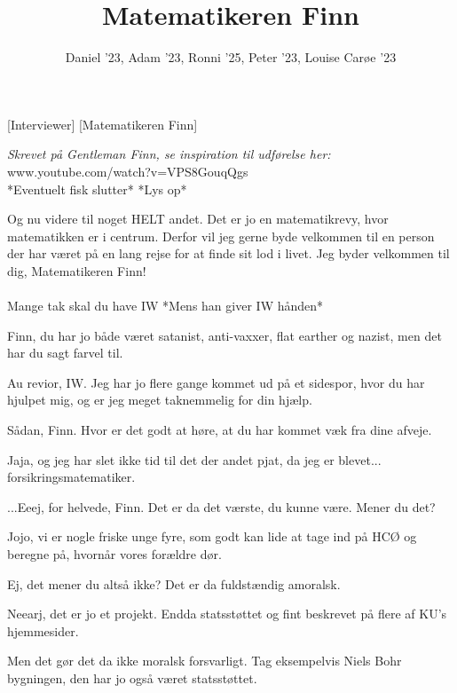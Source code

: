 \documentclass{article}
\title{Matematikeren Finn}
\author{Daniel '23, Adam '23, Ronni '25, Peter '23, Louise Carøe '23}
\begin{document}
\maketitle

\begin{roles}
[Interviewer]
[Matematikeren Finn]
\end{roles}

\begin{sketch}
\noindent\textit{Skrevet på Gentleman Finn, se inspiration til udførelse her:}\\
www.youtube.com/watch?v=VPS8GouqQgs\\

*Eventuelt fisk slutter*
*Lys op*

 Og nu videre til noget HELT andet. Det er jo en matematikrevy, hvor matematikken er i centrum. Derfor vil jeg gerne byde velkommen til en person der har været på en lang rejse for at finde sit lod i livet. Jeg byder velkommen til dig, Matematikeren Finn!\\

\\

 Mange tak skal du have IW *Mens han giver IW hånden*

 Finn, du har jo både været satanist, anti-vaxxer, flat earther og nazist, men det har du sagt farvel til.

 Au revior, IW. Jeg har jo flere gange kommet ud på et sidespor, hvor du har hjulpet mig, og er jeg meget taknemmelig for din hjælp.

 Sådan, Finn. Hvor er det godt at høre, at du har kommet væk fra dine afveje.

 Jaja, og jeg har slet ikke tid til det der andet pjat, da jeg er blevet... forsikringsmatematiker.

 ...Eeej, for helvede, Finn. Det er da det værste, du kunne være. Mener du det?

 Jojo, vi er nogle friske unge fyre, som godt kan lide at tage ind på HCØ og beregne på, hvornår vores forældre dør.

 Ej, det mener du altså ikke? Det er da fuldstændig amoralsk.

 Neearj, det er jo et projekt. Endda statsstøttet og fint beskrevet på flere af KU's hjemmesider.

 Men det gør det da ikke moralsk forsvarligt. Tag eksempelvis Niels Bohr bygningen, den har jo også været statsstøttet.


\end{sketch}
\end{document}
